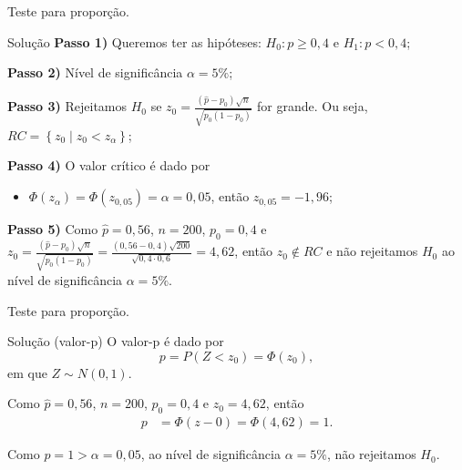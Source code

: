 \documentclass[8pt]{beamer}
\begin{document}
\begin{frame}{Teste para proporção.}

\large

\begin{block}{Solução}
	\textbf{Passo 1)} Queremos ter as hipóteses: $H_0: p \geq 0,4$ e $H_1: p < 0,4$;
	
	\textbf{Passo 2)} Nível de significância $\alpha = 5\%$;
	
	\textbf{Passo 3)} Rejeitamos $H_0$ se $z_0 = \frac{(\hat{p} - p_0)\sqrt{n}}{\sqrt{p_0(1-p_0)}}$ for grande. Ou seja, $RC=\left\{ z_0 \mid z_0 < z_\alpha \right\}$;
	
	\textbf{Passo 4)} O valor crítico é dado por
	\begin{itemize}
		\item $\Phi\left( z_\alpha \right) = \Phi\left( z_{0,05} \right) = \alpha = 0,05$, então $z_{0,05} = -1,96$;
	\end{itemize}

	\textbf{Passo 5)} Como $\hat{p} = 0,56$, $n=200$, $p_0=0,4$ e $z_0= \frac{(\hat{p} - p_0)\sqrt{n}}{\sqrt{p_0(1-p_0)}}=\frac{(0,56-0,4)\sqrt{200}}{\sqrt{0,4 \cdot 0,6}} = 4,62$, então $z_0 \not\in RC$ e não rejeitamos $H_0$ ao nível de significância $\alpha = 5\%$.
\end{block}

\normalsize
\end{frame}

\begin{frame}{Teste para proporção.}

\large
\begin{block}{Solução (valor-p)}
	O valor-p é dado por
	$$p=P\left(Z < z_0 \right) =  \Phi\left(z_0\right),$$
	em que $Z \sim N(0,1)$.
	\vfill
	
	Como $\hat{p}=0,56$, $n=200$, $p_0=0,4$ e $z_0=4,62$, então
	\begin{align*}
	p &= \Phi \left( z-0 \right) = \Phi \left( 4,62 \right) = 1.
	\end{align*}
	\vfill
	
	Como $p=1 > \alpha = 0,05$, ao nível de significância $\alpha=5\%$, não rejeitamos $H_0$.
\end{block}
\normalsize

\end{frame}
\end{document}
